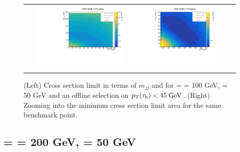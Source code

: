 \begin{figure}[tbh!]
	\centering
	\begin{tabular}{cc}
		\includegraphics[width=0.45\textwidth]{analysis/pics/JetInvMass_vs_MET_xsec_chi100_lsp050_taupt45.pdf}
		\includegraphics[width=0.45\textwidth]{analysis/pics/JetInvMass_vs_MET_xsec_chi100_lsp050_taupt45_zoom.pdf} 		
	\end{tabular}
	\caption{(Left) Cross section limit in terms of $m_{jj}$ and \met for \charginopm = \neutralinotwo = 100 GeV, \neutralinoone = 50 GeV and an offline selection on $p_{\text{T}}(\tau_{\text{h}}) <  45\;\text{Ge}\kern-0.06667em\text{V}$. (Right) Zooming into the minimum cross section limit area for the same benchmark point.}
	\label{fig::JetInvMass_vs_MET_xsec_chi100_lsp050_taupt45}
\end{figure}

\clearpage

\subsection*{\charginopm = \neutralinotwo = 200 GeV, \neutralinoone = 50 GeV}

